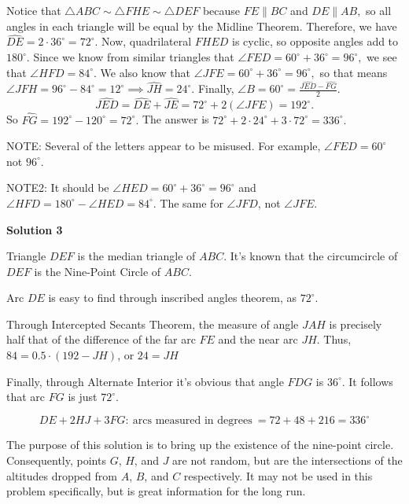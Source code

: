 \begin{enumerate}
Notice that $\triangle ABC \sim \triangle FHE \sim \triangle DEF$ because $FE \parallel BC$ and $DE \parallel AB,$ so all angles in each triangle will be equal by the Midline Theorem. Therefore, we have $\widehat{DE} = 2 \cdot 36^\circ = 72^\circ.$ Now, quadrilateral $FHED$ is cyclic, so opposite angles add to $180^\circ.$ Since we know from similar triangles that $\angle{FED} = 60^\circ + 36^\circ = 96^\circ,$ we see that $\angle{HFD} = 84^\circ.$ We also know that $\angle{JFE} = 60^\circ + 36^\circ = 96^\circ,$ so that means $\angle{JFH} = 96^\circ - 84^\circ = 12^\circ \implies \widehat{JH} = 24^\circ.$ Finally, $\angle{B} = 60^\circ = \frac{\widehat{JED} - \widehat{FG}}{2}.$ 
 \[\widehat{JED} = \widehat{DE} + \widehat{JE} = 72^\circ + 2(\angle{JFE}) = 192^\circ.\] So $\widehat{FG} = 192^\circ - 120^\circ = 72^\circ.$ The answer is $72^\circ + 2\cdot 24^\circ + 3\cdot 72^\circ = \boxed{336^\circ}.$

 
NOTE: Several of the letters appear to be misused. For example, $\angle{FED}=60^\circ$ not $96^\circ$.

 NOTE2: It should be $\angle{HED}=60^\circ + 36^\circ = 96^\circ$ and $\angle{HFD} = 180^\circ - \angle{HED} = 84^\circ$. The same for $\angle{JFD}$, not $\angle{JFE}$.

 



\textbf{Solution 3}

Triangle $DEF$ is the median triangle of $ABC$. It's known that the circumcircle of $DEF$ is the Nine-Point Circle of $ABC$. 

 Arc $DE$ is easy to find through inscribed angles theorem, as $72^\circ$. 

 Through Intercepted Secants Theorem, the measure of angle $JAH$ is precisely half that of the difference of the far arc $FE$ and the near arc $JH$. Thus, $84 = 0.5 \cdot (192-JH)$, or $24 = JH$

 Finally, through Alternate Interior it's obvious that angle $FDG$ is $36^\circ$. It follows that arc $FG$ is just $72^\circ$.

 
 \[DE + 2HJ + 3FG:~\text{arcs measured in degrees}~ = 72 + 48 + 216 = \boxed{336}^\circ\]

 The purpose of this solution is to bring up the existence of the nine-point circle. Consequently, points $G$, $H$, and $J$ are not random, but are the intersections of the altitudes dropped from $A$, $B$, and $C$ respectively. It may not be used in this problem specifically, but is great information for the long run.


\end{enumerate}
